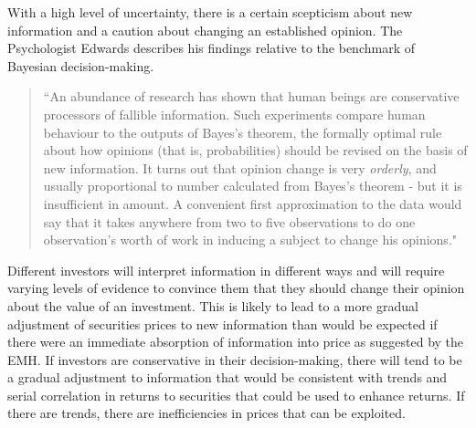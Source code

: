 \documentclass[12pt, a4paper, oneside]{article} %
\begin{document}
With a high level of uncertainty, there is a certain scepticism about new information and a caution about changing an established opinion. The Psychologist Edwards describes his findings relative to the benchmark of Bayesian decision-making.  
\begin{quotation}
``An abundance of research has shown that human beings are conservative processors of fallible information.  Such experiments compare human behaviour to the outputs of Bayes's theorem, the formally optimal rule about how opinions (that is, probabilities) should be revised on the basis of new information.  It turns out that opinion change is very \emph{orderly}, and usually proportional to number calculated from Bayes's theorem  - but it is insufficient in amount.  A convenient first approximation to the data would say that it takes anywhere from two to five observations to do one observation's worth of work in inducing a subject to change his opinions."  
\end{quotation}
\citep[p. 359]{KahnemanUncertainty}  

Different investors will interpret information in different ways and will require varying levels of evidence to convince them that they should change their opinion about the value of an investment.  This is likely to lead to a more gradual adjustment of securities prices to new information than would be expected if there were an immediate absorption of information into price as suggested by the EMH.  If investors are conservative in their decision-making, there will tend to be a gradual adjustment to information that would be consistent with trends and serial correlation in returns to securities that could be used to enhance returns.  If there are trends, there are inefficiencies in prices that can be exploited. 
\end{document}

